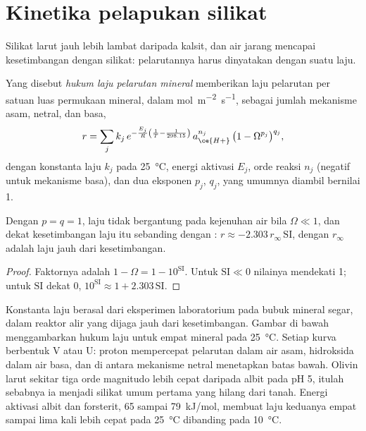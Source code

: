 \section{Kinetika pelapukan silikat}\label{sec:b3:water-rock-interaction:kinetics}

Silikat larut jauh lebih lambat daripada kalsit, dan air jarang mencapai
kesetimbangan dengan silikat: pelarutannya harus dinyatakan dengan suatu laju.

\begin{definition}\label{def:b3:water-rock-interaction:rate-law}
Yang disebut \emph{hukum laju pelarutan mineral}
memberikan laju pelarutan per satuan luas permukaan mineral, dalam
\unit{mol.m^{-2}.s^{-1}}, sebagai jumlah mekanisme asam, netral, dan basa,
\[
r = \sum_j k_j\,e^{-\frac{E_j}{R}\left(\frac1T - \frac1{298.15}\right)}\,
a_{\ce{H+}}^{n_j}\,\bigl(1 - \Omega^{p_j}\bigr)^{q_j},
\]
dengan konstanta laju $k_j$ pada \qty{25}{\celsius}, energi aktivasi $E_j$,
orde reaksi $n_j$ (negatif untuk mekanisme basa), dan dua eksponen
$p_j$, $q_j$, yang umumnya diambil bernilai 1.
\end{definition}

\begin{proposition}\label{prop:b3:water-rock-interaction:affinity}
Dengan $p = q = 1$, laju tidak bergantung pada kejenuhan air
bila $\Omega \ll 1$, dan dekat kesetimbangan laju itu sebanding dengan
: $r \approx -2.303\,r_\infty\,\mathrm{SI}$, dengan
$r_\infty$ adalah laju jauh dari kesetimbangan.
\end{proposition}

\begin{proof}
Faktornya adalah $1 - \Omega = 1 - 10^{\mathrm{SI}}$. Untuk $\mathrm{SI} \ll 0$ nilainya
mendekati 1; untuk $\mathrm{SI}$ dekat 0, $10^{\mathrm{SI}} \approx 1 +
2.303\,\mathrm{SI}$.
\end{proof}

Konstanta laju berasal dari eksperimen laboratorium pada bubuk mineral segar,
dalam reaktor alir yang dijaga jauh dari kesetimbangan. Gambar di bawah menggambarkan
hukum laju untuk empat mineral pada \qty{25}{\celsius}. Setiap kurva berbentuk V atau
U: proton mempercepat pelarutan dalam air asam, hidroksida dalam air basa, dan di
antara mekanisme netral menetapkan batas bawah. Olivin larut sekitar tiga
orde magnitudo lebih cepat daripada albit pada pH 5, itulah sebabnya ia menjadi
silikat umum pertama yang hilang dari tanah. Energi aktivasi albit dan
forsterit, 65 sampai \qty{79}{kJ/mol}, membuat laju keduanya empat sampai lima
kali lebih cepat pada \qty{25}{\celsius} dibanding pada \qty{10}{\celsius}.

